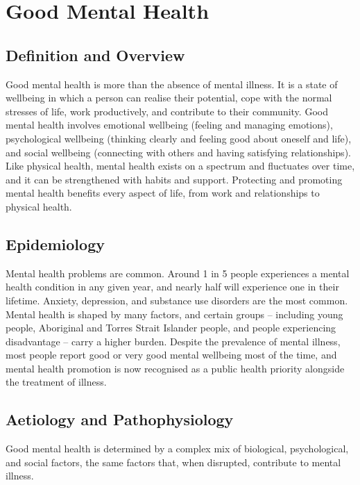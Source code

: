 \chapter{Good Mental Health}

\section*{Definition and Overview}
Good mental health is more than the absence of mental illness. It is a state of wellbeing in which a person can realise their potential, cope with the normal stresses of life, work productively, and contribute to their community. Good mental health involves emotional wellbeing (feeling and managing emotions), psychological wellbeing (thinking clearly and feeling good about oneself and life), and social wellbeing (connecting with others and having satisfying relationships). Like physical health, mental health exists on a spectrum and fluctuates over time, and it can be strengthened with habits and support. Protecting and promoting mental health benefits every aspect of life, from work and relationships to physical health.

\section*{Epidemiology}
Mental health problems are common. Around 1 in 5 people experiences a mental health condition in any given year, and nearly half will experience one in their lifetime. Anxiety, depression, and substance use disorders are the most common. Mental health is shaped by many factors, and certain groups -- including young people, Aboriginal and Torres Strait Islander people, and people experiencing disadvantage -- carry a higher burden. Despite the prevalence of mental illness, most people report good or very good mental wellbeing most of the time, and mental health promotion is now recognised as a public health priority alongside the treatment of illness.

\section*{Aetiology and Pathophysiology}
Good mental health is determined by a complex mix of biological, psychological, and social factors, the same factors that, when disrupted, contribute to mental illness.

